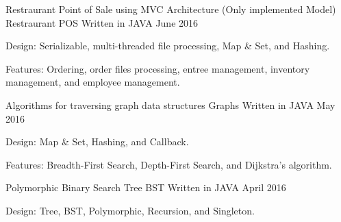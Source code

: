 

\begin{cventries}

  \cventry
    {Restraurant Point of Sale using MVC Architecture (Only implemented Model)} %
    {Restraurant POS} %
    {Written in JAVA} %
    {June 2016} %
    {
      \begin{cvitems} %
          \item {Design: Serializable, multi-threaded file processing, Map \& Set, and Hashing.}
          \item {Features: Ordering, order files processing, entree management, inventory management, and employee management.}
      \end{cvitems}
    }
    
    \cventry
    {Algorithms for traversing graph data structures} %
    {Graphs} %
    {Written in JAVA} %
    {May 2016} %
    {
      \begin{cvitems} %
          \item {Design: Map \& Set, Hashing, and Callback.}
          \item {Features: Breadth-First Search, Depth-First Search, and Dijkstra's algorithm.}
      \end{cvitems}
    }
    
     \cventry
    {Polymorphic Binary Search Tree} %
    {BST} %
    {Written in JAVA} %
    {April 2016} %
    {
      \begin{cvitems} %
          \item {Design: Tree, BST, Polymorphic, Recursion, and Singleton.}
      \end{cvitems}
    }

\end{cventries}
